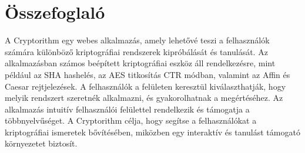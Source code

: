 \chapter*{Összefoglaló}

A Cryptorithm egy webes alkalmazás, amely lehetővé teszi a felhasználók számára különböző kriptográfiai rendszerek kipróbálását és tanulását. Az alkalmazásban számos beépített kriptográfiai eszköz áll rendelkezésre, mint például az SHA hashelés, az AES titkosítás CTR módban, valamint az Affin és Caesar rejtjelezések. A felhasználók a felületen keresztül kiválaszthatják, hogy melyik rendszert szeretnék alkalmazni, és gyakorolhatnak a megértéséhez. Az alkalmazás intuitív felhasználói felülettel rendelkezik és támogatja a többnyelvűséget. A Cryptorithm célja, hogy segítse a felhasználókat a kriptográfiai ismeretek bővítésében, miközben egy interaktív és tanulást támogató környezetet biztosít.